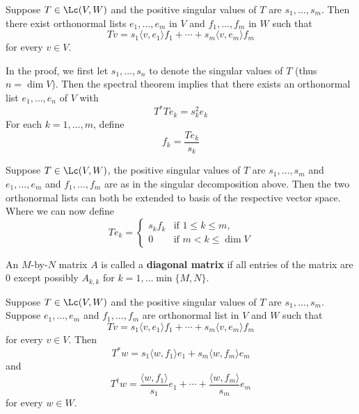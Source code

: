 \documentclass{extarticle}
\begin{document}
\begin{thm}[\textcolor{red}{SINGULAR VALUE DECOMPOSITION}]
    Suppose \(T \in \Lc(V, W)\) and the positive singular values of \(T\) are \(s_1, \ldots, s_m\).
    Then there exist orthonormal lists \(e_1, \ldots, e_m\) in \(V\) and \(f_1, \ldots, f_m\) in \(W\)
    such that
    \[Tv = s_1 \langle v,e_1 \rangle f_1 + \cdots + s_m \langle v,e_m \rangle f_m\]
    for every \(v \in V\).
\end{thm}

\begin{remark}
    In the proof, we first let \(s_1, \ldots, s_n\) to denote the singular values of \(T\) (thus
    \(n = \dim V\)). Then the spectral theorem implies that there exists an orthonormal list \(e_1, \ldots, e_n\)
    of \(V\) with
    \[T^* T e_k = s_k^2 e_k\]
    For each \(k = 1, \ldots, m\), define
    \[f_k = \frac{T e_k}{s_k}\]
\end{remark}

\begin{remark}
    Suppose \(T \in \Lc(V, W)\), the positive singular values of \(T\) are \(s_1, \ldots, s_m\)
    and \(e_1, \ldots, e_m\) and \(f_1, \ldots, f_m\) are as in the singular decomposition above.
    Then the two orthonormal lists can both be extended to basis of the respective vector space.  Where
    we can now define
    \[Te_k = \begin{cases}
        s_k f_k &\text{if } 1 \leq k \leq m, \\
        0 &\text{if } m < k \leq \dim V
    \end{cases}\]
\end{remark}

\begin{definition}
    An \(M\)-by-\(N\) matrix \(A\) is called a \textbf{diagonal matrix} if all entries of the matrix are 0
    except possibly \(A_{k, k}\) for \(k = 1, \ldots \min \{M, N\}\).
\end{definition}

\begin{thm}
    Suppose \(T \in \Lc(V, W)\) and the positive singular values of \(T\) are
    \(s_1, \ldots, s_m\). Suppose \(e_1, \ldots, e_m\) and \(f_1, \ldots, f_m\) are orthonormal
    list in \(V\) and \(W\) such that
    \[Tv = s_1 \langle v,e_1 \rangle f_1 + \cdots + s_m \langle v,e_m \rangle f_m\]
    for every \(v \in V\). Then
    \[T^*w = s_1 \langle w,f_1 \rangle e_1 + s_m \langle w,f_m \rangle e_m\]
    and
    \[T^\dagger w = \frac{\langle w,f_1 \rangle}{s_1}e_1 + \cdots + \frac{\langle w,f_m \rangle}{s_m}e_m\]
    for every \(w \in W\).
\end{thm}
\end{document}
